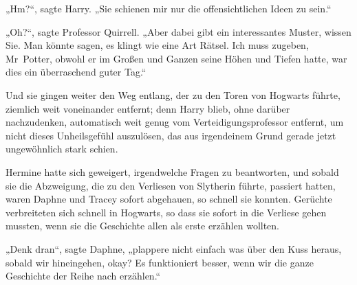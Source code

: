 „Hm?“, sagte Harry. „Sie schienen mir nur die offensichtlichen Ideen zu sein.“

„Oh?“, sagte Professor Quirrell. „Aber dabei gibt ein interessantes Muster, wissen Sie. Man könnte sagen, es klingt wie eine Art Rätsel. Ich muss zugeben, Mr~Potter, obwohl er im Großen und Ganzen seine Höhen und Tiefen hatte, war dies ein überraschend guter Tag.“

Und sie gingen weiter den Weg entlang, der zu den Toren von Hogwarts führte, ziemlich weit voneinander entfernt; denn Harry blieb, ohne darüber nachzudenken, automatisch weit genug vom Verteidigungsprofessor entfernt, um nicht dieses Unheilsgefühl auszulösen, das aus irgendeinem Grund gerade jetzt ungewöhnlich stark schien.


Hermine hatte sich geweigert, irgendwelche Fragen zu beantworten, und sobald sie die Abzweigung, die zu den Verliesen von Slytherin führte, passiert hatten, waren Daphne und Tracey sofort abgehauen, so schnell sie konnten. Gerüchte verbreiteten sich schnell in Hogwarts, so dass sie sofort in die Verliese gehen mussten, wenn sie die Geschichte allen als erste erzählen wollten.

„Denk dran“, sagte Daphne, „plappere nicht einfach was über den Kuss heraus, sobald wir hineingehen, okay? Es funktioniert besser, wenn wir die ganze Geschichte der Reihe nach erzählen.“

